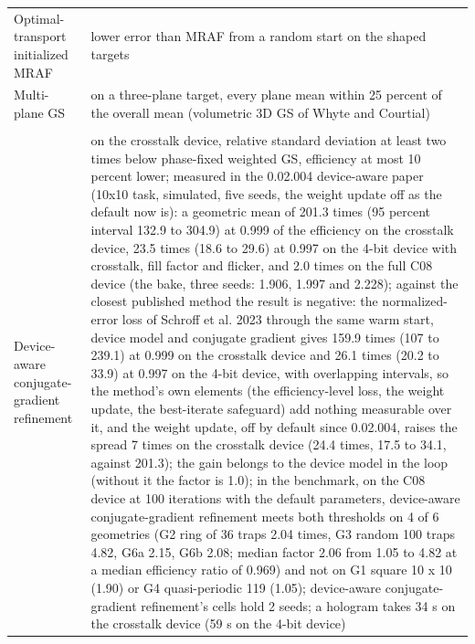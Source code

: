 \begin{longtable}{@{}>{\raggedright\arraybackslash}p{} >{\raggedright\arraybackslash}p{}@{}}
Optimal-transport initialized MRAF & \footnotesize lower error than MRAF from a random start on the shaped targets\\
Multi-plane GS & \footnotesize on a three-plane target, every plane mean within 25 percent of the overall mean (volumetric 3D GS of Whyte and Courtial)\\
\multicolumn{2}{@{}l}{\textit{Methods proposed here}}\\
Device-aware conjugate-gradient refinement & \footnotesize on the crosstalk device, relative standard deviation at least two times below phase-fixed weighted GS, efficiency at most 10 percent lower; measured in the 0.02.004 device-aware paper (10x10 task, simulated, five seeds, the weight update off as the default now is): a geometric mean of 201.3 times (95 percent interval 132.9 to 304.9) at 0.999 of the efficiency on the crosstalk device, 23.5 times (18.6 to 29.6) at 0.997 on the 4-bit device with crosstalk, fill factor and flicker, and 2.0 times on the full C08 device (the bake, three seeds: 1.906, 1.997 and 2.228); against the closest published method the result is negative: the normalized-error loss of Schroff et al. 2023 through the same warm start, device model and conjugate gradient gives 159.9 times (107 to 239.1) at 0.999 on the crosstalk device and 26.1 times (20.2 to 33.9) at 0.997 on the 4-bit device, with overlapping intervals, so the method's own elements (the efficiency-level loss, the weight update, the best-iterate safeguard) add nothing measurable over it, and the weight update, off by default since 0.02.004, raises the spread 7 times on the crosstalk device (24.4 times, 17.5 to 34.1, against 201.3); the gain belongs to the device model in the loop (without it the factor is 1.0); in the benchmark, on the C08 device at 100 iterations with the default parameters, device-aware conjugate-gradient refinement meets both thresholds on 4 of 6 geometries (G2 ring of 36 traps 2.04 times, G3 random 100 traps 4.82, G6a 2.15, G6b 2.08; median factor 2.06 from 1.05 to 4.82 at a median efficiency ratio of 0.969) and not on G1 square 10 x 10 (1.90) or G4 quasi-periodic 119 (1.05); device-aware conjugate-gradient refinement's cells hold 2 seeds; a hologram takes 34 s on the crosstalk device (59 s on the 4-bit device)\\

\end{longtable}
